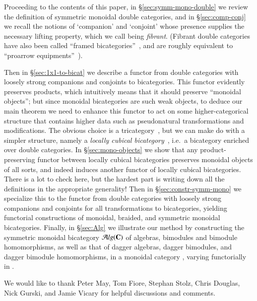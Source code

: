 Proceeding to the contents of this paper, in
\S\ref{sec:symm-mono-double} we review the definition of symmetric
monoidal double categories, and in \S\ref{sec:comp-conj} we recall the
notions of `companion' and `conjoint' whose presence supplies the
necessary lifting property, which we call being \emph{fibrant}.  
(Fibrant double categories have also been called ``framed bicategories''~\cite{shulman:frbi}, and are roughly equivalent to ``proarrow equipments''~\cite{wood:proarrows-i}).

Then in \S\ref{sec:1x1-to-bicat} we describe a functor from double
categories with loosely strong companions and conjoints to bicategories.  This functor evidently preserves products, which intuitively means that it should preserve ``monoidal objects''; but since monoidal bicategories are such weak objects, to deduce our main theorem we need to enhance this functor to act on some higher-categorical structure that contains higher data such as pseudonatural transformations and modifications.
The obvious choice is a tricategory~\cite{gps:tricats}, but we can make do with a simpler structure, namely a \emph{locally cubical bicategory}~\cite{gg:ldstr-tricat}, i.e.\ a bicategory enriched over double categories.
In \S\ref{sec:mono-objects} we show that any product-preserving functor between locally cubical bicategories preserves monoidal objects of all sorts, and indeed induces another functor of locally cubical bicategories.
There is a lot to check here, but the hardest part is writing down all the definitions in the appropriate generality!
Then in \S\ref{sec:constr-symm-mono} we specialize this to the functor from double categories with loosely strong companions and conjoints for all transformations to bicategories, yielding functorial constructions of monoidal, braided, and symmetric monoidal bicategories.
Finally, in \S\ref{sec:Alg} we illustrate our method by constructing the symmetric monoidal bicategory ${\mathcal{A}}lg(\mathbf{C})$ of algebras, bimodules and bimodule homomorphisms, as well as that of dagger algebras, dagger bimodules, and dagger bimodule homomorphisms, in a monoidal category \bC, varying functorially in \bC.

We would like to thank Peter May, Tom Fiore, Stephan Stolz, Chris
Douglas, Nick Gurski, and Jamie Vicary for helpful discussions and comments.

